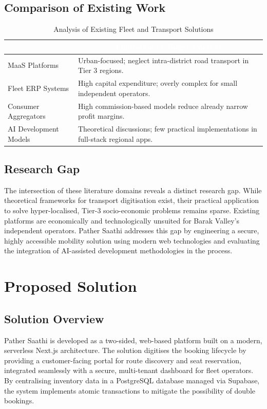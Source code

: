 \documentclass[12pt, a4paper, oneside]{report}
\begin{document}
\section{Comparison of Existing Work}
\begin{table}[htbp]
    \centering
    \caption{Analysis of Existing Fleet and Transport Solutions}
    \renewcommand{\arraystretch}{1.5}
    \begin{tabularx}{\textwidth}{l X}
    \toprule
    \rowcolor{brandteal}
    \multicolumn{1}{c}{\textcolor{white}{\textbf{Existing Work}}} & \multicolumn{1}{c}{\textcolor{white}{\textbf{Limitation in Target Context}}} \\
    \midrule
    \rowcolor{lightgray!30}
    MaaS Platforms & Urban-focused; neglect intra-district road transport in Tier 3 regions. \\
    Fleet ERP Systems & High capital expenditure; overly complex for small independent operators. \\
    \rowcolor{lightgray!30}
    Consumer Aggregators & High commission-based models reduce already narrow profit margins. \\
    AI Development Models & Theoretical discussions; few practical implementations in full-stack regional apps. \\
    \bottomrule
    \end{tabularx}
\end{table}

\section{Research Gap}
The intersection of these literature domains reveals a distinct research gap. While theoretical frameworks for transport digitisation exist, their practical application to solve hyper-localised, Tier-3 socio-economic problems remains sparse. Existing platforms are economically and technologically unsuited for Barak Valley's independent operators. Pather Saathi addresses this gap by engineering a secure, highly accessible mobility solution using modern web technologies and evaluating the integration of AI-assisted development methodologies in the process.

\chapter{Proposed Solution}

\section{Solution Overview}
Pather Saathi is developed as a two-sided, web-based platform built on a modern, serverless Next.js architecture. The solution digitises the booking lifecycle by providing a customer-facing portal for route discovery and seat reservation, integrated seamlessly with a secure, multi-tenant dashboard for fleet operators. By centralising inventory data in a PostgreSQL database managed via Supabase, the system implements atomic transactions to mitigate the possibility of double bookings.
\end{document}
